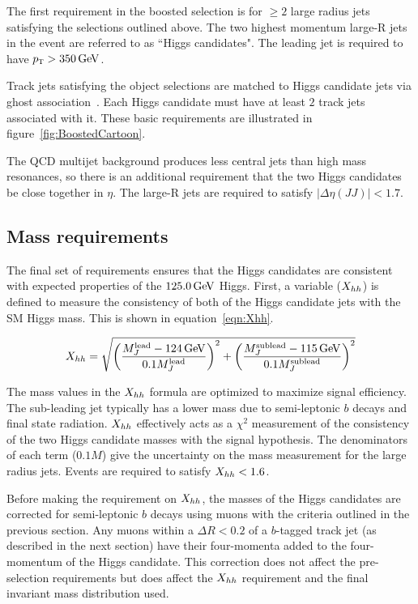 The first requirement in the boosted selection is for $\geq 2$ large radius jets satisfying the selections outlined above. The two highest momentum large-R jets in the event are referred to as ``Higgs candidates". The leading jet is required to have $\pT > 350 \GeV$. 

Track jets satisfying the object selections are matched to Higgs candidate jets via ghost association~\cite{GhostAssociation}. Each Higgs candidate must have at least $2$ track jets associated with it. These basic requirements are illustrated in figure~\ref{fig:BoostedCartoon}.

The QCD multijet background produces less central jets than high mass resonances, so there is an additional requirement that the two Higgs candidates be close together in $\eta$. The large-R jets are required to satisfy $|\Delta\eta(JJ)| < 1.7$. 

\subsection{Mass requirements}

The final set of requirements ensures that the Higgs candidates are consistent with expected properties of the $125.0 \GeV$ Higgs. First, a variable ($X_{hh}$) is defined to measure the consistency of both of the Higgs candidate jets with the SM Higgs mass. This is shown in equation~\ref{eqn:Xhh}. 

\begin{equation}
\label{eqn:Xhh}
\Xhh = \sqrt{\left(\frac{M_J^{\rm lead} - 124 \GeV}{0.1 M_J^{\rm lead}}\right)^2 + \left(\frac{M_J^{\rm sublead} - 115 \GeV}{0.1 M_J^{\rm sublead}}\right)^2}
\end{equation}

The mass values in the $X_{hh}$ formula are optimized to maximize signal efficiency. The sub-leading jet typically has a lower mass due to semi-leptonic $b$ decays and final state radiation. $X_{hh}$ effectively acts as a $\chi^2$ measurement of the consistency of the two Higgs candidate masses with the signal hypothesis. The denominators of each term ($0.1M$) give the uncertainty on the mass measurement for the large radius jets. Events are required to satisfy $X_{hh} < 1.6$. 

Before making the requirement on $X_{hh}$, the masses of the Higgs candidates are corrected for semi-leptonic $b$ decays using muons with the criteria outlined in the previous section. Any muons within a $\Delta R < 0.2$ of a $b$-tagged track jet (as described in the next section) have their four-momenta added to the four-momentum of the Higgs candidate. This correction does not affect the pre-selection requirements but does affect the $X_{hh}$ requirement and the final invariant mass distribution used. 

